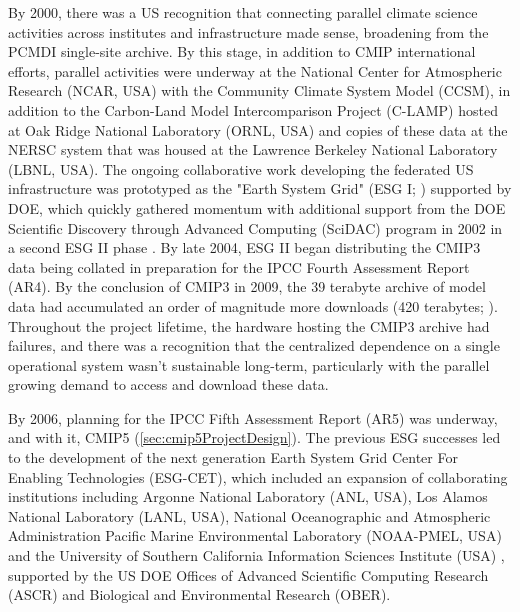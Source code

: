 \documentclass[gmd, preprint]{copernicus}
\begin{document}
By 2000, there was a US recognition that connecting parallel climate science activities across institutes and infrastructure made sense, broadening from the PCMDI single-site archive. By this stage, in addition to CMIP international efforts, parallel activities were underway at the National Center for Atmospheric Research (NCAR, USA) with the Community Climate System Model (CCSM), in addition to the Carbon-Land Model Intercomparison Project (C-LAMP) hosted at Oak Ridge National Laboratory (ORNL, USA) and copies of these data at the NERSC system that was housed at the Lawrence Berkeley National Laboratory (LBNL, USA). The ongoing collaborative work developing the federated US infrastructure was prototyped as the "Earth System Grid" (ESG I; \citet{bernholdt_earth_2007}) supported by DOE, which quickly gathered momentum with additional support from the DOE Scientific Discovery through Advanced Computing (SciDAC) program in 2002 in a second ESG II phase \citep{williams_earth_2009}. By late 2004, ESG II began distributing the CMIP3 data being collated in preparation for the IPCC Fourth Assessment Report (AR4). By the conclusion of CMIP3 in 2009, the 39 terabyte archive of model data had accumulated an order of magnitude more downloads (420 terabytes; \citet{ananthakrishnan_building_2007, williams_earth_2009}). Throughout the project lifetime, the hardware hosting the CMIP3 archive had failures, and there was a recognition that the centralized dependence on a single operational system wasn't sustainable long-term, particularly with the parallel growing demand to access and download these data.

By 2006, planning for the IPCC Fifth Assessment Report (AR5) was underway, and with it, CMIP5 (\autoref{sec:cmip5ProjectDesign}). The previous ESG successes led to the development of the next generation Earth System Grid Center For Enabling Technologies (ESG-CET), which included an expansion of collaborating institutions including Argonne National Laboratory (ANL, USA), Los Alamos National Laboratory (LANL, USA), National Oceanographic and Atmospheric Administration Pacific Marine Environmental Laboratory (NOAA-PMEL, USA) and the University of Southern California Information Sciences Institute (USA) \citep{ananthakrishnan_building_2007}, supported by the US DOE Offices of Advanced Scientific Computing Research (ASCR) and Biological and Environmental Research (OBER).
\end{document}
